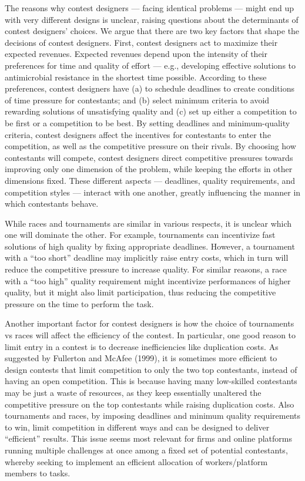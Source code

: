 \documentclass[10pt, titlepage]{article}
\begin{document}
The reasons why contest designers --- facing identical problems ---
might end up with very different designs is unclear, raising questions
about the determinants of contest designers' choices. We argue that
there are two key factors that shape the decisions of contest designers.
First, contest designers act to maximize their expected revenues.
Expected revenues depend upon the intensity of their preferences for
time and quality of effort --- e.g., developing effective solutions to
antimicrobial resistance in the shortest time possible. According to
these preferences, contest designers have (a) to schedule deadlines to
create conditions of time pressure for contestants; and (b) select
minimum criteria to avoid rewarding solutions of unsatisfying quality
and (c) set up either a competition to be first or a competition to be
best. By setting deadlines and minimum-quality criteria, contest
designers affect the incentives for contestants to enter the
competition, as well as the competitive pressure on their rivals. By
choosing how contestants will compete, contest designers direct
competitive pressures towards improving only one dimension of the
problem, while keeping the efforts in other dimensions fixed. These
different aspects --- deadlines, quality requirements, and competition
styles --- interact with one another, greatly influencing the manner in
which contestants behave.

While races and tournaments are similar in various respects, it is
unclear which one will dominate the other. For example, tournaments can
incentivize fast solutions of high quality by fixing appropriate
deadlines. However, a tournament with a ``too short'' deadline may
implicitly raise entry costs, which in turn will reduce the competitive
pressure to increase quality. For similar reasons, a race with a ``too
high'' quality requirement might incentivize performances of higher
quality, but it might also limit participation, thus reducing the
competitive pressure on the time to perform the task.

Another important factor for contest designers is how the choice of
tournaments vs races will affect the efficiency of the contest. In
particular, one good reason to limit entry in a contest is to decrease
inefficiencies like duplication costs. As suggested by Fullerton and
McAfee (1999), it is sometimes more efficient to design contests that
limit competition to only the two top contestants, instead of having an
open competition. This is because having many low-skilled contestants
may be just a waste of resources, as they keep essentially unaltered the
competitive pressure on the top contestants while raising duplication
costs. Also tournaments and races, by imposing deadlines and minimum
quality requirements to win, limit competition in different ways and can
be designed to deliver ``efficient'' results. This issue seems most
relevant for firms and online platforms running multiple challenges at
once among a fixed set of potential contestants, whereby seeking to
implement an efficient allocation of workers/platform members to tasks.
\end{document}
